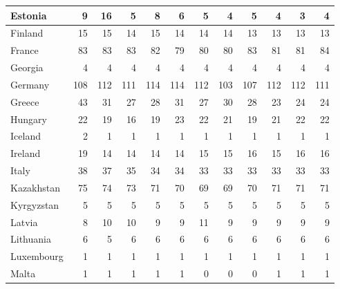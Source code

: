 \begin{table}
\begin{tabular}{|l|r|r|r|r|r|r|r|r|r|r|r|}
                       Estonia&      9&     16&      5&      8&      6&      5&      4&      5&      4&      3&      4\\\hline
                       Finland&     15&     15&     14&     15&     14&     14&     14&     13&     13&     13&     13\\\hline
                        France&     83&     83&     83&     82&     79&     80&     80&     83&     81&     81&     84\\\hline
                       Georgia&      4&      4&      4&      4&      4&      4&      4&      4&      4&      4&      4\\\hline
                       Germany&    108&    112&    111&    114&    114&    112&    103&    107&    112&    112&    111\\\hline
                        Greece&     43&     31&     27&     28&     31&     27&     30&     28&     23&     24&     24\\\hline
                       Hungary&     22&     19&     16&     19&     23&     22&     21&     19&     21&     22&     22\\\hline
                       Iceland&      2&      1&      1&      1&      1&      1&      1&      1&      1&      1&      1\\\hline
                       Ireland&     19&     14&     14&     14&     14&     15&     15&     16&     15&     16&     16\\\hline
                         Italy&     38&     37&     35&     34&     34&     33&     33&     33&     33&     33&     33\\\hline
                    Kazakhstan&     75&     74&     73&     71&     70&     69&     69&     70&     71&     71&     71\\\hline
                    Kyrgyzstan&      5&      5&      5&      5&      5&      5&      5&      5&      5&      5&      5\\\hline
                        Latvia&      8&     10&     10&      9&      9&     11&      9&      9&      9&      9&      9\\\hline
                     Lithuania&      6&      5&      6&      6&      6&      6&      6&      6&      6&      6&      6\\\hline
                    Luxembourg&      1&      1&      1&      1&      1&      1&      1&      1&      1&      1&      1\\\hline
                         Malta&      1&      1&      1&      1&      1&      0&      0&      0&      1&      1&      1\\\hline

\end{tabular}
\end{table}
